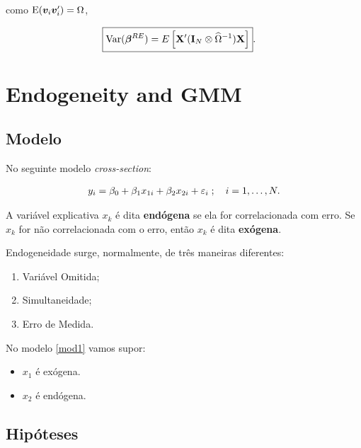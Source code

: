 \documentclass[11pt, oneside, a4paper, article]{article}
\numberwithin{equation}{section}
\begin{document}
\begin{description}
	\noindent
	como $\text{E}( \boldsymbol{v}_{i} \boldsymbol{v}_{i}' ) =\Omega$,

	\vspace{-1 em}
	\begin{align*} 
		\Aboxed{
			\Var( \betavec^{RE} ) = 
			E
		\left[ \Xmat' ( \Imat_{N} \otimes \widehat{\Omega}^{-1} ) \Xmat \right] }.
	\end{align*}



	\clearpage
	\section{Endogeneity and GMM}


	\subsection{Modelo}

	No seguinte modelo \textit{cross-section}:

	\vspace{-1 em}
	\begin{align} \label{mod1}
		y_{i} = \beta_{0} + \beta_{1} x_{1i} + \beta_{2} x_{2i} + \varepsilon_{i}
		\; ; \quad i = 1, \dots, N.
	\end{align}

	\noindent
	A variável explicativa $x_{k}$ é dita \textbf{endógena} se ela for correlacionada com erro.
	Se $x_{k}$ for não correlacionada com o erro, então $x_{k}$ é dita \textbf{exógena}.

	Endogeneidade surge, normalmente, de três maneiras diferentes:

	\begin{enumerate}\itemsep0pt
		\item Variável Omitida;
		\item Simultaneidade;
		\item Erro de Medida.
	\end{enumerate}

	No modelo \eqref{mod1} vamos supor:

	\begin{itemize}\itemsep0pt
		\item $x_{1}$ é exógena.
		\item $x_{2}$ é endógena.
	\end{itemize}

	\subsection{Hipóteses}


\end{description}
\end{document}
